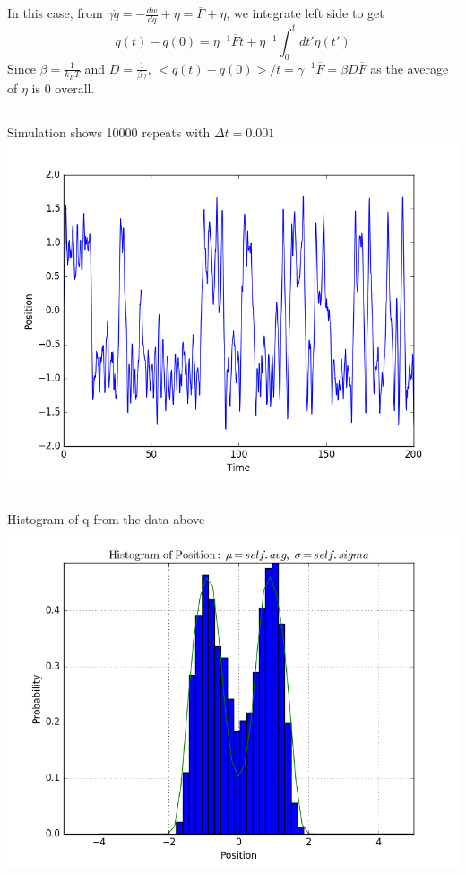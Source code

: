 \documentclass[11pt, oneside]{article}   	%
\begin{document}
\subsection{}
In this case, from $\gamma \dot{q} = -\frac{dw}{dq} + \eta = \overline{F} + \eta$, we integrate left side to get 
$$ q(t) - q(0) = \eta ^{-1} \overline{F}t + \eta ^{-1} \int_{0}^{t} dt'\eta (t')$$
Since $\beta = \frac{1}{k_B T}$ and $D = \frac{1}{ \beta \gamma}$, $<q(t) - q(0)>/t = \gamma ^{-1} \overline{F} = \beta D\overline{F}$
as the average of $\eta$ is 0 overall.

\subsection{}
Simulation shows 10000 repeats with $\Delta t= 0.001$
\includegraphics[scale = 0.5]{qvst.png}

\subsection{}
Histogram of q from the data above
\includegraphics[scale = 0.5]{hist4.png}
\end{document}
